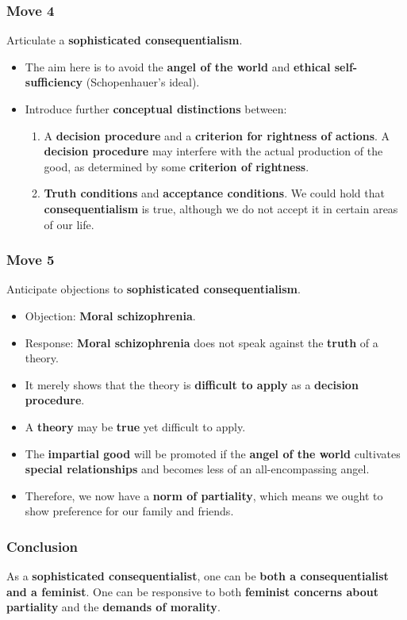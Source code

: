 \documentclass[11pt]{article}
\begin{document}
\subsubsection{Move 4}
\label{sec:org74dd796}
Articulate a \textbf{sophisticated consequentialism}.
\begin{itemize}
\item The aim here is to avoid the \textbf{angel of the world} and \textbf{ethical self-sufficiency} (Schopenhauer's ideal).
\item Introduce further \textbf{conceptual distinctions} between:
\begin{enumerate}
\item A \textbf{decision procedure} and a \textbf{criterion for rightness of actions}.
A \textbf{decision procedure} may interfere with the actual production of the good, as determined by some \textbf{criterion of rightness}.
\item \textbf{Truth conditions} and \textbf{acceptance conditions}.
We could hold that \textbf{consequentialism} is true, although we do not accept it in certain areas of our life.
\end{enumerate}
\end{itemize}
\subsubsection{Move 5}
\label{sec:orgcbbbe43}
Anticipate objections to \textbf{sophisticated consequentialism}.
\begin{itemize}
\item Objection: \textbf{Moral schizophrenia}.
\item Response: \textbf{Moral schizophrenia} does not speak against the \textbf{truth} of a theory.
\item It merely shows that the theory is \textbf{difficult to apply} as a \textbf{decision procedure}.
\item A \textbf{theory} may be \textbf{true} yet difficult to apply.
\item The \textbf{impartial good} will be promoted if the \textbf{angel of the world} cultivates \textbf{special relationships} and becomes less of an all-encompassing angel.
\item Therefore, we now have a \textbf{norm of partiality}, which means we ought to show preference for our family and friends.
\end{itemize}
\subsubsection{Conclusion}
\label{sec:org41140de}
As a \textbf{sophisticated consequentialist}, one can be \textbf{both a consequentialist and a feminist}. One can be responsive to both \textbf{feminist concerns about partiality} and the \textbf{demands of morality}.
\end{document}
